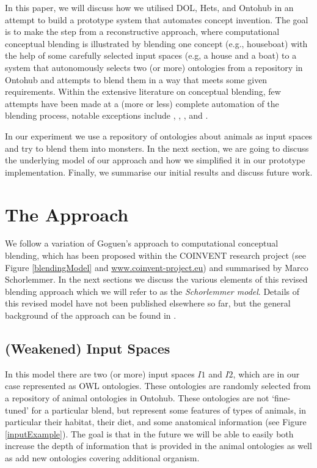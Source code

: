 \documentclass{ecai2012}
\begin{document}
In this paper, we will discuss how we utilised DOL, Hets, and Ontohub in an attempt to build 
a prototype system that automates concept invention. The goal is to make the step from a
 reconstructive approach, where computational conceptual blending is illustrated by blending 
 one concept (e.g., houseboat) with the help of some carefully selected input spaces
  (e.g, a house and a boat) to a system that autonomously selects two (or more) ontologies 
  from a repository in Ontohub and attempts to blend them in a way that meets some given requirements. Within the extensive literature on conceptual blending, few attempts have been made at a  (more or less) complete automation of the blending process, notable exceptions include \cite{goguenharrell10}, \cite{Pereira07}, \cite{LiEtAl2012}, and \cite{veale2000computation,Veale2012}.
  
 \medskip\noindent 
  In our experiment we use a repository of ontologies about animals as input spaces and try to blend
   them into monsters.  In the next section, we are going to discuss the underlying model 
   of our approach and how we simplified it in our prototype implementation.  Finally, we summarise our initial results and discuss future work. 

\section{The Approach}
We follow a variation of Goguen's approach to computational conceptual blending,
which has been proposed within the COINVENT research project (see Figure \ref{blendingModel} and \url{www.coinvent-project.eu}) and summarised by Marco Schorlemmer. In the next sections we discuss the various elements of this revised blending approach which we will refer to as the \emph{Schorlemmer model}. Details of this revised model have not been published elsewhere so far, but the general background of the approach can be found in \cite{iccc14-coinvent}.

\subsection{(Weakened) Input Spaces}
 In this model there are two (or more) input spaces $I1$ and $I2$, which are in our 
 case represented as OWL ontologies.  These ontologies are randomly selected from a repository 
 of animal ontologies in Ontohub. These ontologies are not `fine-tuned' for a particular blend, 
 but represent some features of types of animals, in particular their habitat, their diet, 
 and some anatomical information (see Figure \ref{inputExample}). The goal is that in the future 
 we will be able to easily both increase the depth of information that is provided in the animal ontologies as 
 well as add new ontologies covering additional organism. 
 
\end{document}
